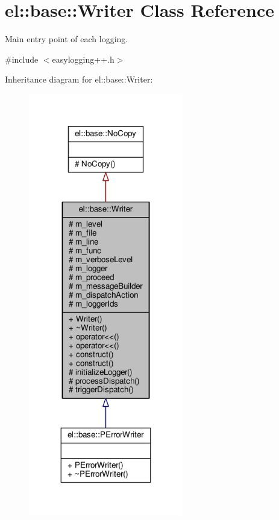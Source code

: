 \hypertarget{classel_1_1base_1_1Writer}{}\section{el\+:\+:base\+:\+:Writer Class Reference}
\label{classel_1_1base_1_1Writer}


Main entry point of each logging.  




{\ttfamily \#include $<$easylogging++.\+h$>$}



Inheritance diagram for el\+:\+:base\+:\+:Writer\+:
\nopagebreak
\begin{figure}[H]
\begin{center}
\leavevmode
\includegraphics[width=191pt]{d5/de7/classel_1_1base_1_1Writer__inherit__graph}
\end{center}
\end{figure}



